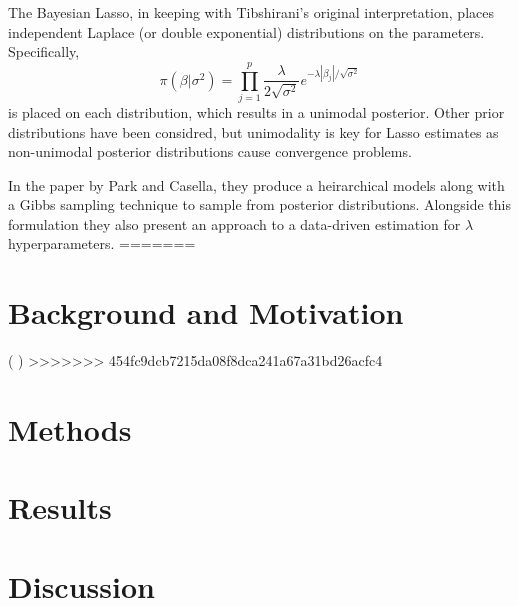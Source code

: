 \documentclass{uwstat572}
\newcommand{\vmcomment}[1]{({\color{blue}{VM's comment:}} \textbf{\color{blue}{#1}})}
\begin{document}
The Bayesian Lasso, in keeping with Tibshirani's original interpretation, places independent Laplace (or double exponential) distributions on the parameters. Specifically, \[
\pi(\beta|\sigma^2)=\prod_{j=1}^p\frac{\lambda}{2\sqrt{\sigma^2}}e^{-\lambda |\beta_j|/\sqrt{\sigma^2}}
\] is placed on each distribution, which results in a unimodal posterior. Other prior distributions have been considred, but unimodality is key for Lasso estimates as non-unimodal posterior distributions cause convergence problems.

In the paper by Park and Casella, they produce a heirarchical models along with a Gibbs sampling technique to sample from posterior distributions. Alongside this formulation they also present an approach to a data-driven estimation for $\lambda$ hyperparameters.\cite{park2008bayesian}
=======
\section{Background and Motivation}
\vmcomment{I don't think you need a separate Background section; make it a Methods subsection if needed}
>>>>>>> 454fc9dcb7215da08f8dca241a67a31bd26acfc4

\section{Methods}

\section{Results}

\section{Discussion}


\end{document}
